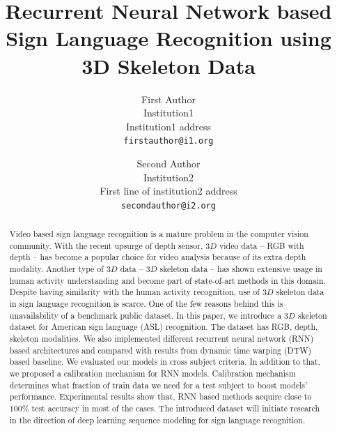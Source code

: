 \documentclass[10pt,twocolumn,letterpaper]{article}
\begin{document}
\title{Recurrent Neural Network based Sign Language Recognition using 3D Skeleton Data}

\author{First Author\\
Institution1\\
Institution1 address\\
{\tt\small firstauthor@i1.org}
\and
Second Author\\
Institution2\\
First line of institution2 address\\
{\tt\small secondauthor@i2.org}
}

\maketitle

\begin{abstract}
Video based sign language recognition is a mature problem in the computer vision community. With the recent upsurge of depth sensor, $3D$ video data -- RGB with depth -- has become a popular choice for video analysis because of its extra depth modality. Another type of $3D$ data -- $3D$ skeleton data -- has shown extensive usage in human activity understanding and become part of state-of-art methods in this domain. Despite having similarity with the human activity recognition, use of $3D$ skeleton data in sign language recognition is scarce. One of the few reasons behind this is unavailability of a benchmark public dataset. In this paper, we introduce a $3D$ skeleton dataset for American sign language (ASL) recognition. The dataset has RGB, depth, skeleton modalities. We also implemented different recurrent neural network (RNN) based architectures and compared with results from dynamic time warping (DTW) based baseline. We evaluated our models in cross subject criteria. In addition to that, we proposed a calibration mechanism for RNN models. Calibration mechanism determines what fraction of train data we need for a test subject to boost models' performance. Experimental results show that, RNN based methods acquire close to $100\%$ test accuracy in most of the cases. The introduced dataset will initiate research in the direction of deep learning sequence modeling for sign language recognition. 
\end{abstract}
\end{document}
